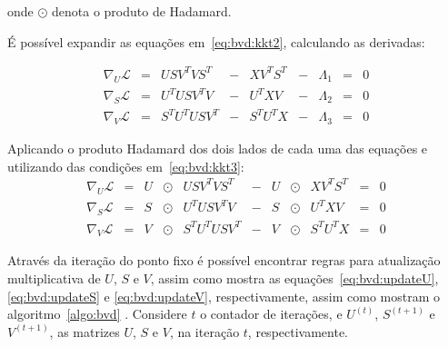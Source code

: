 \documentclass[
    12pt,                %
    oneside,            %
    a4paper,            %
    english,            %
    brazil                %
    ]{abntex2ppgsi}
\begin{document}
onde $\odot$ denota o produto de Hadamard.

É possível expandir as equações em~\ref{eq:bvd:kkt2}, calculando as derivadas:

\[
\begin{array}{lclclclcl}
    \nabla_U \mathcal{L} & = & U S V^{T} V S^{T}     & - & X V^{T} S^{T} & - & \Lambda_1 & = & 0 \\
    \nabla_S \mathcal{L} & = & U^{T} U S V^{T} V     & - & U^{T} X V     & - & \Lambda_2 & = & 0 \\
    \nabla_V \mathcal{L} & = & S^{T} U^{T} U S V^{T} & - & S^{T} U^{T} X & - & \Lambda_3 & = & 0
\end{array}
\]

Aplicando o produto Hadamard dos dois lados de cada uma das equações e utilizando das condições em~\ref{eq:bvd:kkt3}:
\[
\begin{array}{lclclclclcl}
    \nabla_U \mathcal{L} & = & U & \odot & U S V^{T} V S^{T}     & - & U & \odot & X V^{T} S^{T} & = & 0 \\
    \nabla_S \mathcal{L} & = & S & \odot & U^{T} U S V^{T} V     & - & S & \odot & U^{T} X V     & = & 0 \\
    \nabla_V \mathcal{L} & = & V & \odot & S^{T} U^{T} U S V^{T} & - & V & \odot & S^{T} U^{T} X & = & 0
\end{array}
\]

Através da iteração do ponto fixo é possível encontrar regras para atualização multiplicativa de $U$, $S$ e $V$, assim como mostra as equações~\ref{eq:bvd:updateU}, \ref{eq:bvd:updateS} e \ref{eq:bvd:updateV}, respectivamente, assim como mostram o algoritmo~\ref{algo:bvd} \cite{Long2005}.
Considere $t$ o contador de iterações, e $U^{(t)}$, $S^{(t+1)}$ e $V^{(t+1)}$, as matrizes $U$, $S$ e $V$, na iteração $t$, respectivamente.
\end{document}
